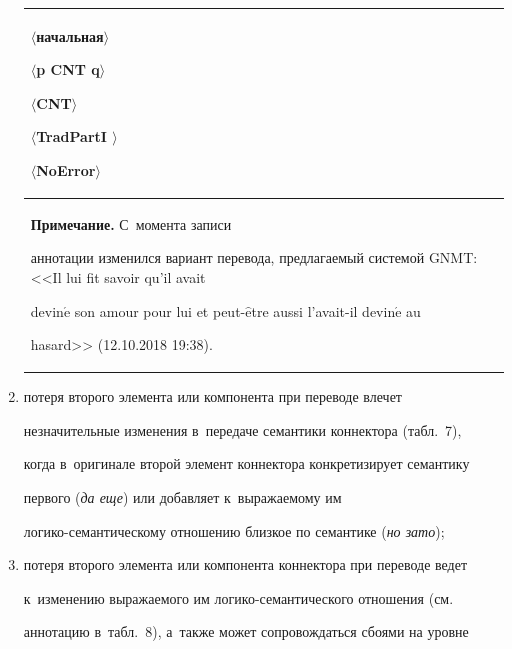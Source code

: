 \begin{multicols}{2}
\begin{enumerate}[(1)]
\begin{table}
\begin{center}
\begin{tabular}{|p{50.2mm}|p{31mm}|p{42mm}|p{26mm}|}
$\langle$начальная$\rangle$\newline


$\langle$p CNT q$\rangle$\newline


$\langle$CNT$\rangle$\newline


$\langle$TradPartI $\rangle$\newline


$\langle$NoError$\rangle$\\


\hline


\multicolumn{4}{p{160mm}}{\footnotesize \hspace*{2mm}\textbf{Примечание.} С~момента записи 


аннотации изменился вариант перевода, предлагаемый системой GNMT: <<Il lui fit savoir qu'il avait 


devin$\acute{\mbox{e}}$ son amour pour lui et peut-$\hat{\mbox{e}}$tre aussi l'avait-il devin$\acute{\mbox{e}}$ au 


hasard>> (12.10.2018 19:38).}


\end{tabular}


\end{center}


\end{table}





    


\item потеря второго элемента или компонента при переводе влечет 


незначительные изменения в~передаче семантики коннектора (табл.~7), 


когда в~оригинале второй элемент коннектора конкретизирует семантику 


первого (\textit{да еще}) или добавляет к~выражаемому им 


логико-семантическому отношению близкое по семантике (\textit{но зато});








\item потеря второго элемента или компонента коннектора при переводе ведет 


к~изменению вы\-ра\-жа\-емо\-го им ло\-ги\-ко-се\-ман\-ти\-че\-ско\-го отношения (см.\ 


аннотацию в~табл.~8), а~также может сопровождаться сбоями на уровне 



\end{enumerate}
\end{multicols}
